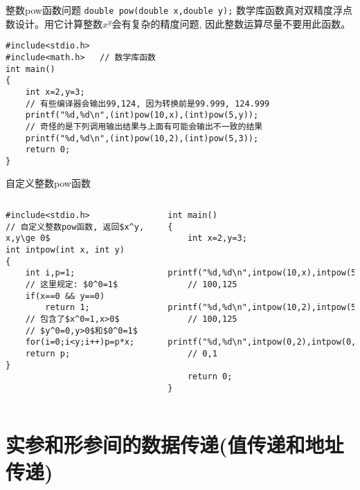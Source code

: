 \begin{frame}{整数pow函数问题}
\vspace{-0.3cm}
\lstinline|double pow(double x,double y);| 数学库函数真对双精度浮点数设计。用它计算整数$x^y$会有复杂的精度问题, 因此整数运算尽量不要用此函数。 
\begin{lstlisting}
#include<stdio.h>
#include<math.h>   // 数学库函数
int main()
{
	int x=2,y=3;
	// 有些编译器会输出99,124, 因为转换前是99.999, 124.999 
	printf("%d,%d\n",(int)pow(10,x),(int)pow(5,y)); 	
	// 奇怪的是下列调用输出结果与上面有可能会输出不一致的结果 
	printf("%d,%d\n",(int)pow(10,2),(int)pow(5,3)); 
	return 0;
}
\end{lstlisting}
\end{frame}

\begin{frame}{自定义整数pow函数}
\vspace{-0.5cm}
\begin{columns}[T]
\begin{lstlisting}
#include<stdio.h>
// 自定义整数pow函数, 返回$x^y, x,y\ge 0$
int intpow(int x, int y)
{
	int i,p=1;
	// 这里规定: $0^0=1$
	if(x==0 && y==0) 
		return 1;
	// 包含了$x^0=1,x>0$ 
	// $y^0=0,y>0$和$0^0=1$
	for(i=0;i<y;i++)p=p*x;
	return p;
} 
\end{lstlisting}
\begin{lstlisting}[frame=leftline]
int main()
{
	int x=2,y=3;
	
	printf("%d,%d\n",intpow(10,x),intpow(5,y)); 
	// 100,125
	printf("%d,%d\n",intpow(10,2),intpow(5,3)); 
	// 100,125
	printf("%d,%d\n",intpow(0,2),intpow(0,0)); 
	// 0,1 
	
	return 0;
}
\end{lstlisting}
\end{columns}
\end{frame}


\section{实参和形参间的数据传递(值传递和地址传递)}

